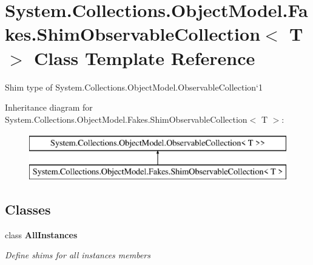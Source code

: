 \hypertarget{class_system_1_1_collections_1_1_object_model_1_1_fakes_1_1_shim_observable_collection_3_01_t_01_4}{\section{System.\-Collections.\-Object\-Model.\-Fakes.\-Shim\-Observable\-Collection$<$ T $>$ Class Template Reference}
\label{class_system_1_1_collections_1_1_object_model_1_1_fakes_1_1_shim_observable_collection_3_01_t_01_4}
}


Shim type of System.\-Collections.\-Object\-Model.\-Observable\-Collection`1 


Inheritance diagram for System.\-Collections.\-Object\-Model.\-Fakes.\-Shim\-Observable\-Collection$<$ T $>$\-:\begin{figure}[H]
\begin{center}
\leavevmode
\includegraphics[height=2.000000cm]{class_system_1_1_collections_1_1_object_model_1_1_fakes_1_1_shim_observable_collection_3_01_t_01_4}
\end{center}
\end{figure}
\subsection*{Classes}
\begin{DoxyCompactItemize}
\item 
class {\bfseries All\-Instances}
\begin{DoxyCompactList}\small\item\em Define shims for all instances members\end{DoxyCompactList}\end{DoxyCompactItemize}
